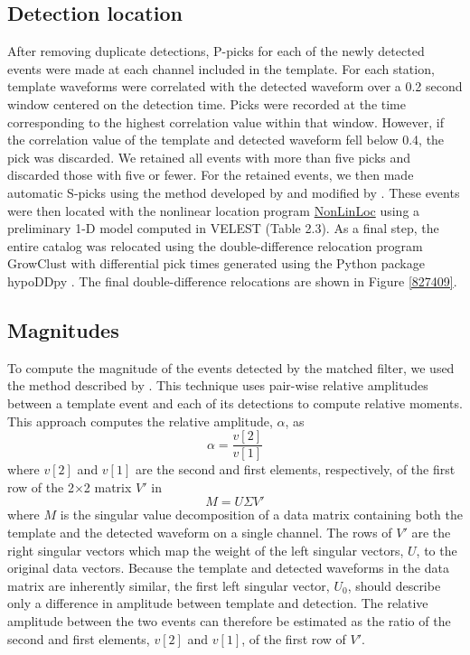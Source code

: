 \subsection{Detection location} \label{methods_location}
After removing duplicate detections, P-picks for each of the newly detected
events were made at each channel included in the template. For each station, template waveforms were correlated with the detected waveform over a 0.2 second window centered on the detection time. Picks were recorded at the time corresponding to the highest correlation value within that window. However, if the correlation value of the template and detected waveform fell below 0.4, the pick was discarded. We retained all events with more than five picks and discarded those with five or fewer. For the retained events, we then made automatic S-picks \citep{mroczek_2019} using the method developed by \citet{Diehl_2009} and modified by \citet{Castellazzi_2015}. These events were then located with the nonlinear location program \href{http://alomax.free.fr/nlloc/}{NonLinLoc} \citep{Lomax_2014} using a preliminary 1-D model computed in VELEST \citep{Kissling_1994,sewell2017}(Table 2.3). As a final step, the entire catalog was relocated using the double-difference relocation program GrowClust \citep{Trugman_2017} with differential pick times generated using the Python package hypoDDpy \citep{lion_krischer_2015_18907}. The final double-difference relocations are shown in Figure \ref{827409}.

\subsection{Magnitudes} \label{methods_magnitudes}
To compute the magnitude of the events detected by the matched filter,
we used the method described by \citet{Shelly_2016}. This technique uses pair-wise relative amplitudes between a template event and each of its detections to compute relative moments. This approach computes the relative amplitude, $\alpha$, as
\begin{equation}
\alpha = \frac{v[2]}{v[1]}
\end{equation}
where $v[2]$ and $v[1]$ are the second and first elements, respectively, of the first row of the 2$\times$2 matrix $V'$ in
\begin{equation}
M = U\Sigma V'
\end{equation}
where $M$ is the singular value decomposition of a data matrix containing both the template and the detected waveform on a single channel. The rows of $V'$ are the right singular vectors which map the weight of the left singular vectors, $U$, to the original data vectors. Because the template and detected waveforms in the data matrix are inherently similar, the first left singular vector, $U_0$, should describe only a difference in amplitude between template and detection. The relative amplitude between the two events can therefore be estimated as the ratio of the second and first elements, $v[2]$ and $v[1]$, of the first row of $V'$.

